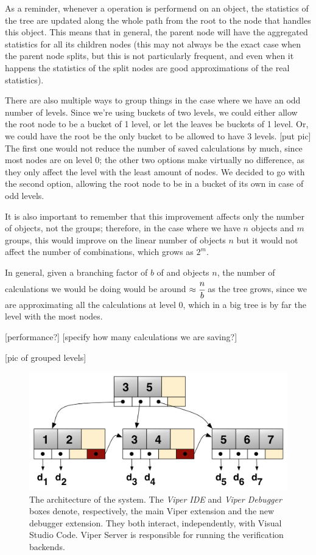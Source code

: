 As a reminder, whenever a operation is performend on an object, the statistics of the tree are updated along the whole path from the root to the node that handles this object. This means that in general, the parent node will have the aggregated statistics for all its children nodes (this may not always be the exact case when the parent node splits, but this is not particularly frequent, and even when it happens the statistics of the split nodes are good approximations of the real statistics).

There are also multiple ways to group things in the case where we have an odd number of levels. Since we're using buckets of two levels, we could either allow the root node to be a bucket of 1 level, or let the leaves be buckets of 1 level. Or, we could have the root be the only bucket to be allowed to have 3 levels. [put pic] The first one would not reduce the number of saved calculations by much, since most nodes are on level 0; the other two options make virtually no difference, as they only affect the level with the least amount of nodes. We decided to go with the second option, allowing the root node to be in a bucket of its own in case of odd levels.

It is also important to remember that this improvement affects only the number of objects, not the groups; therefore, in the case where we have $n$ objects and $m$ groups, this would improve on the linear number of objects $n$ but it would not affect the number of combinations, which grows as $2^m$.

In general, given a branching factor of $b$ of and objects $n$, the number of calculations we would be doing would be around $\approx\cfrac{n}{b}$ as the tree grows, since we are approximating all the calculations at level 0, which in a big tree is by far the level with the most nodes.

[performance?]
[specify how many calculations we are saving?]

[pic of grouped levels]
\begin{figure}[htb]
  \centering
  \includegraphics[width=\textwidth,height=\textheight,keepaspectratio]{img/b+tree.png}
  \caption[The architecture of the system]{ The architecture of the system. The
    \textit{Viper IDE} and \textit{Viper Debugger} boxes denote, respectively,
    the main Viper extension and the new debugger extension. They both interact,
    independently, with Visual Studio Code. Viper Server is responsible for
    running the verification backends.}
  \label{fig:b+tree}
\end{figure}

